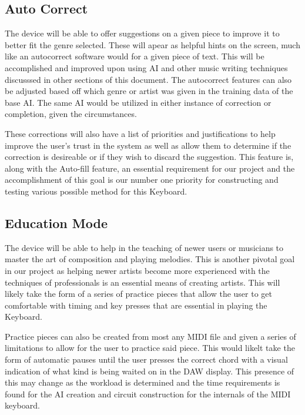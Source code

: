 \subsection{Auto Correct}

The device will be able to offer suggestions on a given piece to improve it to better fit
the genre selected. These will apear as helpful hints on the screen, much like an
autocorrect software would for a given piece of text. This will be accomplished and
improved upon using AI and other music writing techniques discusssed in other sections of
this document. The autocorrect features can also be adjusted based off which genre or
artist was given in the training data of the base AI. The same AI would be utilized in
either instance of correction or completion, given the circumstances. 

These corrections will also have a list of priorities and justifications to help improve
the user's trust in the system as well as allow them to determine if the correction is
desireable or if they wish to discard the suggestion. This feature is, along with the
Auto-fill feature, an essential requirement for our project and the accomplishment of this
goal is our number one priority for constructing and testing various possible method for
this Keyboard.

\subsection{Education Mode}

The device will be able to help in the teaching of newer users or musicians to master the
art of composition and playing melodies. This is another pivotal goal in our
project as helping newer artists become more experienced with the techniques of
professionals is an essential means of creating artists. This will likely take the form of
a series of practice pieces that allow the user to get comfortable with timing and key
presses that are essential in playing the Keyboard. 

Practice pieces can also be created from most any MIDI file and given a series of
limitations to allow for the user to practice said piece. This would likelt take the form
of automatic pauses until the user presses the correct chord with a visual indication of
what kind is being waited on in the DAW display. This presence of this may change as the
workload is determined and the time requirements is found for the AI creation and circuit
construction for the internals of the MIDI keyboard.

